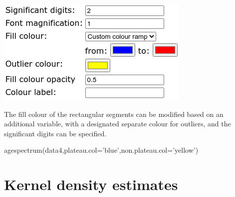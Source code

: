 \begin{refsection}
\begin{enumerate}
\noindent\begin{minipage}[t]{.4\linewidth}
  \strut\vspace*{-\baselineskip}\newline
  \includegraphics[width=\linewidth]{../figures/OtherAgeSpectrumExtraOptions.png}
\end{minipage}
\begin{minipage}[t]{.6\linewidth}
  The fill colour of the rectangular segments can be modified based on
  an additional variable, with a designated separate colour for
  outliers, and the significant digits can be specified.
\end{minipage}

\begin{console}
agespectrum(data4,plateau.col='blue',non.plateau.col='yellow')
\end{console}
  
\end{enumerate}

\section{Kernel density estimates}\label{sec:OtherKDE}


\end{refsection}
